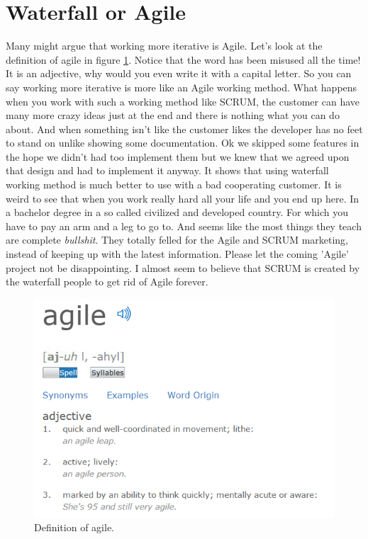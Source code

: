 \section{Waterfall or Agile}
Many might argue that working more iterative is Agile. Let's look at the definition of agile in figure \ref{fig:agile}. Notice that the word has been misused all the time! It is an adjective, why would you even write it with a capital letter. So you can say working more iterative is more like an Agile working method. What happens when you work with such a working method like SCRUM, the customer can have many more crazy ideas just at the end and there is nothing what you can do about. And when something isn't like the customer likes the developer has no feet to stand on unlike showing some documentation. Ok we skipped some features in the hope we didn't had too implement them but we knew that we agreed upon that design and had to implement it anyway. It shows that using waterfall working method is much better to use with a bad cooperating customer. It is weird to see that when you work really hard all your life and you end up here. In a bachelor degree in a so called civilized and developed country. For which you have to pay an arm and a leg to go to. And seems like the most things they teach are complete \emph{bullshit}. They totally felled for the Agile and SCRUM marketing, instead of keeping up with the latest information. Please let the coming 'Agile' project not be disappointing. I almost seem to believe that SCRUM is created by the waterfall people to get rid of Agile forever.

\begin{figure}[h!]
	\centering
	\includegraphics[width=\textwidth]{agile.png}
	\caption{Definition of agile.}
	\label{fig:agile}
\end{figure}


